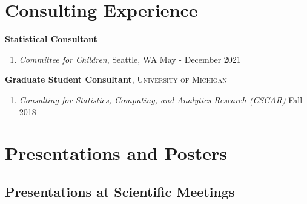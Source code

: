 \documentclass[letterpaper,11pt]{article} %
\begin{document}
\section*{Consulting Experience}
		\noindent \textbf{Statistical Consultant}
		\begin{enumerate}
			\item \textit{Committee for Children}, Seattle, WA \hfill May - December 2021
		\end{enumerate}
		
		\noindent \textbf{Graduate Student Consultant}, \textsc{University of Michigan} 
		\begin{enumerate}
			\item \textit{Consulting for Statistics, Computing, and Analytics Research (CSCAR)} \hfill Fall 2018 
		\end{enumerate}
		 
		 
	\section*{Presentations and Posters}
	
	\subsection*{Presentations at Scientific Meetings}
\end{document}
